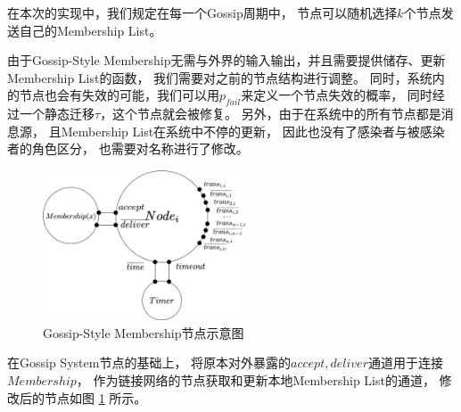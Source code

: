 在本次的实现中，我们规定在每一个Gossip周期中，
节点可以随机选择$k$个节点发送自己的Membership List。

由于Gossip-Style Membership无需与外界的输入输出，并且需要提供储存、更新Membership List的函数，
我们需要对之前的节点结构进行调整。
同时，系统内的节点也会有失效的可能，我们可以用$p_{fail}$来定义一个节点失效的概率，
同时经过一个静态迁移$\tau$，这个节点就会被修复。
另外，由于在系统中的所有节点都是消息源，
且Membership List在系统中不停的更新，
因此也没有了感染者与被感染者的角色区分，
也需要对名称进行了修改。
\begin{figure}[!htbp]
	\small
	\centering
	\includegraphics[width=6cm]{../figures/Node.png}
    \caption{Gossip-Style Membership节点示意图}
    \label{fig:membership_node}
\end{figure}
在Gossip System节点的基础上，
将原本对外暴露的$accept,deliver$通道用于连接$Membership$，
作为链接网络的节点获取和更新本地Membership List的通道，
修改后的节点如图
\ref{fig:membership_node}
所示。

